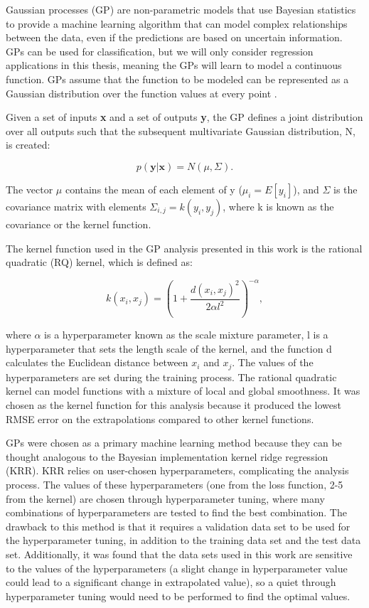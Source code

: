 Gaussian processes (GP) are non-parametric models that use Bayesian statistics to provide a machine learning algorithm that can model complex relationships between the data, even if the predictions are based on uncertain information. GPs can be used for classification, but we will only consider regression applications in this thesis, meaning the GPs will learn to model a continuous function. GPs assume that the function to be modeled can be represented as a Gaussian distribution over the function values at every point \cite{Ref11, Ref12, Ref169}.  

Given a set of inputs \textbf{x} and a set of outputs \textbf{y}, the GP defines a joint distribution over all outputs such that the subsequent multivariate Gaussian distribution, N, is created:

$$p(\textbf{y} | \textbf{x}) = N(\mu, \Sigma).$$

The vector \textbf{$\mu$} contains the mean of each element of y ($\mu_i = E[y_i]$), and $\Sigma$ is the covariance matrix with elements $\Sigma_{i,j} = k(y_i, y_j)$, where k is known as the covariance or the kernel function.


The kernel function used in the GP analysis presented in this work is the rational quadratic (RQ) kernel, which is defined as:

$$k(x_i,x_j) = (1 + \frac{d(x_i, x_j)^2}{2\alpha l^2})^{-\alpha},$$

where $\alpha$ is a hyperparameter known as the scale mixture parameter, l is a hyperparameter that sets the length scale of the kernel, and the function d calculates the Euclidean distance between $x_i$ and $x_j$. The values of the hyperparameters are set during the training process. The rational quadratic kernel can model functions with a mixture of local and global smoothness. It was chosen as the kernel function for this analysis because it produced the lowest RMSE error on the extrapolations compared to other kernel functions.

GPs were chosen as a primary machine learning method because they can be thought analogous to the Bayesian implementation kernel ridge regression (KRR). KRR relies on user-chosen hyperparameters, complicating the analysis process. The values of these hyperparameters (one from the loss function, 2-5 from the kernel) are chosen through hyperparameter tuning, where many combinations of hyperparameters are tested to find the best combination. The drawback to this method is that it requires a validation data set to be used for the hyperparameter tuning, in addition to the training data set and the test data set. Additionally, it was found that the data sets used in this work are sensitive to the values of the hyperparameters (a slight change in hyperparameter value could lead to a significant change in extrapolated value), so a quiet through hyperparameter tuning would need to be performed to find the optimal values.


